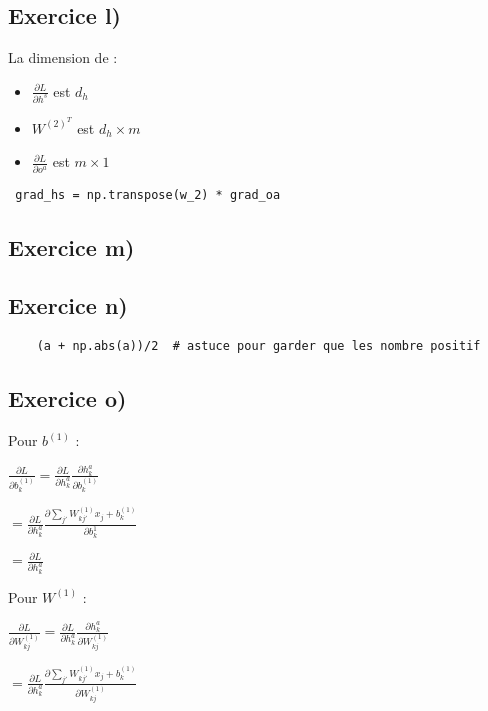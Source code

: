 \documentclass[a4paper,10pt]{article}
\begin{document}
\subsection{Exercice l)}

La dimension de :
\begin{itemize}
	\item $\frac{\partial L}{\partial h^{s}}$ est $d_{h}$
	\item $W^{(2)^T} $ est $d_{h} \times m$
	\item $\frac{\partial L}{\partial o^{a}}$ est $ m \times 1$
\end{itemize}

\begin{verbatim}
 grad_hs = np.transpose(w_2) * grad_oa	
\end{verbatim}

\subsection{Exercice m)}

\subsection{Exercice n)}

\begin{verbatim}
	(a + np.abs(a))/2  # astuce pour garder que les nombre positif
\end{verbatim}


\subsection{Exercice o)}

Pour $b^{(1)}$ :

$\frac{\partial L}{\partial b^{(1)}_{k}} = \frac{\partial L}{\partial h^{a}_{k}} \frac{\partial h^{a}_{k}}{\partial b^{(1)}_{k}}$

$ = \frac{\partial L}{\partial h^{a}_{k}} \frac{\partial \sum_{j'} W^{(1)}_{kj'} x_{j} + b^{(1)}_{k}}{\partial b^{1}_{k}}$

$ = \frac{\partial L}{\partial h^{a}_{k}}$

Pour $W^{(1)}$ :

$\frac{\partial L}{\partial W^{(1)}_{kj}} = \frac{\partial L}{\partial h^{a}_{k}} \frac{\partial h^{a}_{k}}{\partial W^{(1)}_{kj}} $

$ = \frac{\partial L}{\partial h^{a}_{k}} \frac{\partial \sum_{j'} W^{(1)}_{kj'} x_{j} + b^{(1)}_{k}}{\partial W^{(1)}_{kj}}$
\end{document}
